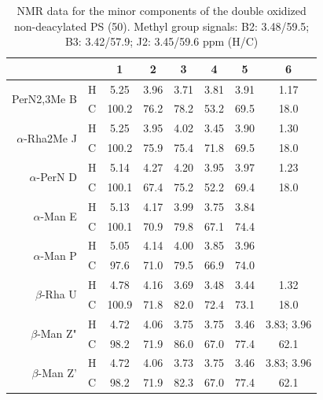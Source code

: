         \begin{table}[htb]
          \centering
          \caption[\Ac{NMR} data for the minor components of the double oxidized non-deacylated \ac{PS}]{\ac{NMR} data for the minor components of the double oxidized non-deacylated \ac{PS} (50\cel). Methyl group signals: B2: 3.48/59.5; B3: 3.42/57.9; J2: 3.45/59.6 ppm (H/C)}
          \label{tbl:lpsends}
          \begin{tabular}{@{}rccccccc@{}}
            \toprule
            &   & 1     & 2    & 3    & 4    & 5    & 6 \\ \midrule
            \multirow{2}{*}{PerN2,3Me B}       & H & 5.25  & 3.96 & 3.71 & 3.81 & 3.91 & 1.17 \\
            & C & 100.2 & 76.2 & 78.2 & 53.2 & 69.5 & 18.0 \\
            \multirow{2}{*}{$\alpha$-Rha2Me J} & H & 5.25  & 3.95 & 4.02 & 3.45 & 3.90 & 1.30 \\
            & C & 100.2 & 75.9 & 75.4 & 71.8 & 69.5 & 18.0 \\
            \multirow{2}{*}{$\alpha$-PerN D}   & H & 5.14  & 4.27 & 4.20 & 3.95 & 3.97 & 1.23 \\
            & C & 100.1 & 67.4 & 75.2 & 52.2 & 69.4 & 18.0 \\
            \multirow{2}{*}{$\alpha$-Man E}    & H & 5.13  & 4.17 & 3.99 & 3.75 & 3.84 & \\
            & C & 100.1 & 70.9 & 79.8 & 67.1 & 74.4 & \\
            \multirow{2}{*}{$\alpha$-Man P}    & H & 5.05  & 4.14 & 4.00 & 3.85 & 3.96 & \\
            & C & 97.6  & 71.0 & 79.5 & 66.9 & 74.0 & \\
            \multirow{2}{*}{$\beta$-Rha U}     & H & 4.78  & 4.16 & 3.69 & 3.48 & 3.44 & 1.32 \\
            & C & 100.9 & 71.8 & 82.0 & 72.4 & 73.1 & 18.0 \\
            \multirow{2}{*}{$\beta$-Man Z"}    & H & 4.72  & 4.06 & 3.75 & 3.75 & 3.46 & 3.83; 3.96 \\
            & C & 98.2  & 71.9 & 86.0 & 67.0 & 77.4 & 62.1 \\
            \multirow{2}{*}{$\beta$-Man Z'}    & H & 4.72  & 4.06 & 3.73 & 3.75 & 3.46 & 3.83; 3.96 \\
            & C & 98.2  & 71.9 & 82.3 & 67.0 & 77.4 & 62.1 \\ \bottomrule
          \end{tabular}
        \end{table} %

